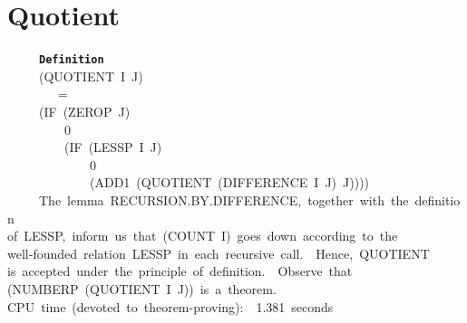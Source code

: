 \documentclass[11pt]{book}
\newenvironment{pubasis}{\begin{flushleft}\ttfamily\small}{\normalsize\rmfamily\end{flushleft}}
\newcommand{\axiomordefinition}[1]{\vspace{6pt}\texttt{\textbf{#1}}}
\newcommand{\pubdefaulttextsize}{\large}
\begin{document}
\section{Quotient}
\pubdefaulttextsize
\begin{pubasis}
~~~~~\axiomordefinition{Definition}\\
~~~~~(QUOTIENT~I~J)\\
~~~~~~~~=\\
~~~~~(IF~(ZEROP~J)\\
~~~~~~~~~0\\
~~~~~~~~~(IF~(LESSP~I~J)\\
~~~~~~~~~~~~~0\\
~~~~~~~~~~~~~(ADD1~(QUOTIENT~(DIFFERENCE~I~J)~J))))\\

~~~~~The~lemma~RECURSION.BY.DIF\-FER\-ENCE,~together~with~the~definition\\
of~LESSP,~inform~us~that~(COUNT~I)~goes~down~according~to~the\\
well-founded~relation~LESSP~in~each~recursive~call.~~Hence,~QUOTIENT\\
is~accepted~under~the~principle~of~definition.~~Observe~that\\
(NUMBERP~(QUOTIENT~I~J))~is~a~theorem.\\

CPU~time~(devoted~to~theorem-proving):~~1.381~seconds\\
\end{pubasis}
\end{document}
